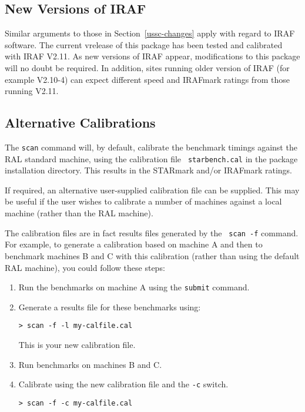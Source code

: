 \subsection{New Versions of IRAF}

Similar arguments to those in Section~\ref{ussc-changes} apply with
regard to IRAF software. The current v\pkgver release of this package has
been tested and calibrated with IRAF V2.11. As new versions of IRAF appear,
modifications to this package will no doubt be required. In addition, sites
running older version of IRAF (for example V2.10-4) can expect different
speed and IRAFmark ratings from those running V2.11.

\subsection{Alternative Calibrations}
\label{calfile}

The {\tt scan} command will, by default, calibrate the benchmark timings
against the RAL standard machine, using the calibration file {\tt
starbench.cal} in the package installation directory. This results in
the STARmark and/or IRAFmark ratings.

If required, an alternative user-supplied calibration file can be
supplied. This may be useful if the user wishes to calibrate a
number of machines against a local machine (rather than the RAL
machine).

The calibration files are in fact results files generated by the {\tt
scan -f} command. For example, to generate a calibration based on
machine A and then to benchmark machines B and C with this calibration
(rather than using the default RAL machine), you could follow these
steps:

\begin{enumerate}
\item Run the benchmarks on machine A using the {\tt submit} command.
\item Generate a results file for these benchmarks using:

{\tt > scan -f -l my-calfile.cal}

This is your new calibration file.

\item Run benchmarks on machines B and C.
\item Calibrate using the new calibration file and the {\tt -c} switch.

{\tt > scan -f -c my-calfile.cal}
\end{enumerate}

